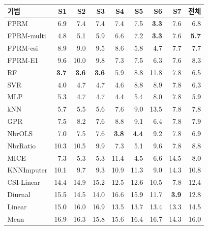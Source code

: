 \begin{tabular}{lrrrrrrrr}
\toprule
기법 & S1 & S2 & S3 & S4 & S5 & S6 & S7 & 전체 \\
\midrule
FPRM & 6.9 & 7.4 & 7.4 & 7.4 & 7.5 & \textbf{3.3} & 7.6 & 6.8 \\
FPRM-multi & 4.8 & 5.1 & 5.9 & 6.6 & 7.2 & \textbf{3.3} & 7.6 & \textbf{5.7} \\
FPRM-csi & 8.9 & 9.0 & 9.5 & 8.6 & 5.8 & 4.7 & 7.7 & 7.7 \\
FPRM-E1 & 9.6 & 10.0 & 9.8 & 7.3 & 7.5 & 6.3 & 7.6 & 8.3 \\
\midrule
RF & \textbf{3.7} & \textbf{3.6} & \textbf{3.6} & 5.9 & 8.8 & 11.8 & 7.8 & 6.5 \\
SVR & 4.0 & 4.7 & 4.7 & 4.6 & 8.8 & 8.9 & 7.8 & 6.3 \\
MLP & 5.3 & 4.7 & 4.7 & 4.4 & 5.4 & 8.0 & 7.8 & 5.9 \\
kNN & 5.7 & 5.5 & 5.6 & 7.6 & 9.0 & 13.5 & 7.8 & 7.8 \\
GPR & 7.5 & 8.2 & 7.6 & 8.8 & 9.1 & 6.4 & 7.8 & 7.9 \\
\midrule
NbrOLS & 7.0 & 7.5 & 7.6 & \textbf{3.8} & \textbf{4.4} & 9.2 & 7.8 & 6.9 \\
NbrRatio & 10.3 & 10.5 & 9.9 & 7.3 & 5.1 & 9.6 & 7.8 & 8.8 \\
MICE & 7.3 & 5.3 & 5.3 & 11.4 & 4.5 & 6.6 & 14.5 & 8.0 \\
KNNImputer & 10.1 & 9.7 & 9.3 & 10.9 & 11.3 & 9.0 & 14.3 & 10.8 \\
\midrule
CSI-Linear & 14.4 & 14.9 & 15.2 & 12.5 & 12.6 & 10.5 & 7.8 & 12.4 \\
Diurnal & 15.5 & 14.5 & 14.0 & 16.6 & 15.9 & 11.7 & \textbf{3.9} & 12.8 \\
Linear & 15.0 & 16.0 & 16.9 & 13.5 & 13.7 & 13.4 & 13.3 & 14.5 \\
Mean & 16.9 & 16.3 & 15.8 & 15.6 & 16.4 & 16.7 & 14.3 & 16.0 \\
\bottomrule
\end{tabular}

